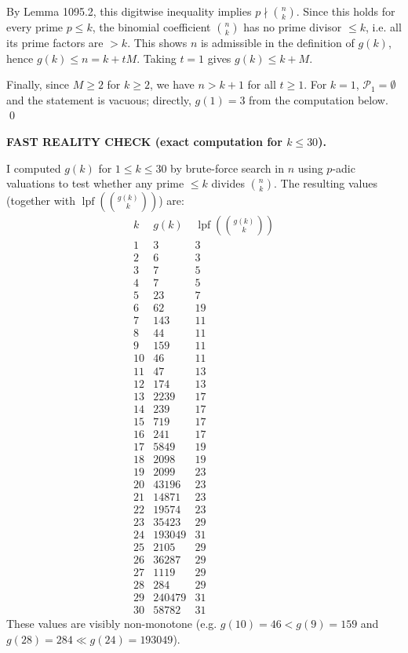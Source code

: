 By Lemma 1095.2, this digitwise inequality implies $p\nmid \binom{n}{k}$.
Since this holds for every prime $p\le k$, the binomial coefficient $\binom{n}{k}$ has no prime divisor $\le k$, i.e. all its prime factors are $>k$. This shows $n$ is admissible in the definition of $g(k)$, hence $g(k)\le n=k+tM$. Taking $t=1$ gives $g(k)\le k+M$.

Finally, since $M\ge 2$ for $k\ge 2$, we have $n>k+1$ for all $t\ge 1$. For $k=1$, $\mathcal{P}_1=\emptyset$ and the statement is vacuous; directly, $g(1)=3$ from the computation below. \qed

\smallskip
\noindent\textbf{FAST REALITY CHECK (exact computation for $k\le 30$).}

\smallskip
\noindent
I computed $g(k)$ for $1\le k\le 30$ by brute-force search in $n$ using $p$-adic valuations to test whether any prime $\le k$ divides $\binom{n}{k}$. The resulting values (together with $\operatorname{lpf}(\binom{g(k)}{k})$) are:
\[
\begin{array}{r|r|r}
 k & g(k) & \operatorname{lpf}\!\left(\binom{g(k)}{k}\right) \\\hline
 1& 3& 3\\
 2& 6& 3\\
 3& 7& 5\\
 4& 7& 5\\
 5& 23& 7\\
 6& 62& 19\\
 7& 143& 11\\
 8& 44& 11\\
 9& 159& 11\\
 10& 46& 11\\
 11& 47& 13\\
 12& 174& 13\\
 13& 2239& 17\\
 14& 239& 17\\
 15& 719& 17\\
 16& 241& 17\\
 17& 5849& 19\\
 18& 2098& 19\\
 19& 2099& 23\\
 20& 43196& 23\\
 21& 14871& 23\\
 22& 19574& 23\\
 23& 35423& 29\\
 24& 193049& 31\\
 25& 2105& 29\\
 26& 36287& 29\\
 27& 1119& 29\\
 28& 284& 29\\
 29& 240479& 31\\
 30& 58782& 31
\end{array}
\]
These values are visibly non-monotone (e.g. $g(10)=46<g(9)=159$ and $g(28)=284\ll g(24)=193049$).


